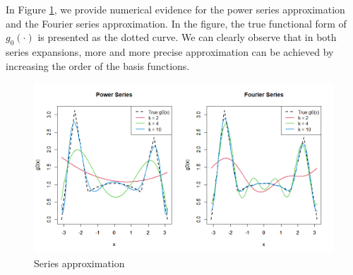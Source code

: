 \documentclass[10.5pt, A4paper, openany, uplatex]{book}
\numberwithin{equation}{section}
\begin{document}
In Figure \ref{fig:seriesreg}, we provide numerical evidence for the power series approximation and the Fourier series approximation.
In the figure, the true functional form of $g_0(\cdot)$ is presented as the dotted curve.
We can clearly observe that in both series expansions, more and more precise approximation can be achieved by increasing the order of the basis functions.

\begin{figure}[h!]
	\begin{center}
		\includegraphics[width = 17cm]{seriesreg.png}
		\caption{Series approximation}\label{fig:seriesreg}
	\end{center}
\end{figure}
\end{document}
